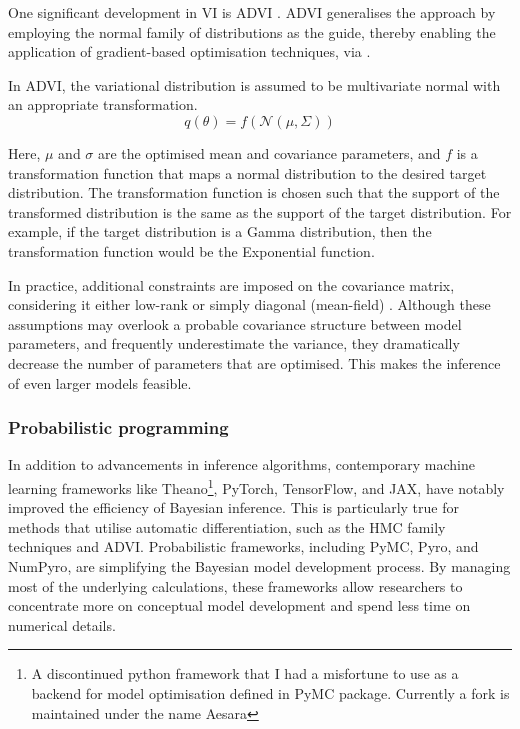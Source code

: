 One significant development in \ac{VI} is \ac{ADVI} \parencite{Kucukelbir2016-gn}. \ac{ADVI} generalises the approach by employing the normal family of distributions as the guide, thereby enabling the application of gradient-based optimisation techniques, via .

In \ac{ADVI}, the variational distribution is assumed to be multivariate normal with an appropriate transformation.
\begin{equation}
q(\theta) = f(\mathcal{N}(\mu, \Sigma))
\end{equation}

Here, $\mu$ and $\sigma$ are the optimised mean and covariance parameters, and $f$ is a transformation function that maps a normal distribution to the desired target distribution. The transformation function is chosen such that the support of the transformed distribution is the same as the support of the target distribution. For example, if the target distribution is a Gamma distribution, then the transformation function would be the Exponential function. 

In practice, additional constraints are imposed on the covariance matrix, considering it either low-rank or simply diagonal (mean-field) \parencite{Blei2017-dm}. Although these assumptions may overlook a probable covariance structure between model parameters, and frequently underestimate the variance, they dramatically decrease the number of parameters that are optimised. This makes the inference of even larger models feasible.

\subsubsection*{Probabilistic programming}
In addition to advancements in inference algorithms, contemporary machine learning frameworks like \ac{Theano}\footnote{A discontinued python framework that I had a misfortune to use as a backend for model optimisation defined in PyMC package. Currently a fork is maintained under the name Aesara}, \ac{PyTorch}, \ac{TensorFlow}, and \ac{JAX}, have notably improved the efficiency of Bayesian inference. This is particularly true for methods that utilise automatic differentiation, such as the \ac{HMC} family techniques and \ac{ADVI}. Probabilistic frameworks, including \ac{PyMC}, \ac{Pyro}, and \ac{NumPyro}, are simplifying the Bayesian model development process. By managing most of the underlying calculations, these frameworks allow researchers to concentrate more on conceptual model development and spend less time on numerical details.

